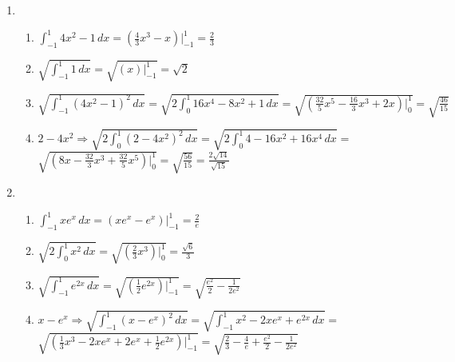 \documentclass[12pt]{article}
\begin{document}
\begin{enumerate}
\begin{enumerate}
    \end{enumerate}

    \setcounter{enumi}{38}

  \item

    \begin{enumerate}

      \item $\int_{-1}^1 4x^2-1\,dx=\left( \frac{4}{3}x^3-x \right)\Big|_{-1}^1=\frac{2}{3}$

      \item $\sqrt{\int_{-1}^1 1\,dx}=\sqrt{(x)\Big|_{-1}^1}=\sqrt{2}$

      \item $\sqrt{\int_{-1}^1 \left( 4x^2-1 \right)^2\,dx}=\sqrt{2\int_0^1 16x^4-8x^2+1\,dx}=\sqrt{\left(\frac{32}{5}x^5-\frac{16}{3}x^3+2x\right)\Big|_0^1}=\sqrt{\frac{46}{15}}$

      \item $2-4x^2\Rightarrow\sqrt{2\int_0^1 \left(2-4x^2\right)^2\,dx}=\sqrt{2\int_0^1 4-16x^2+16x^4\,dx}=$\\$\sqrt{\left(8x-\frac{32}{3}x^3+\frac{32}{5}x^5\right)\Big|_0^1}=\sqrt{\frac{56}{15}}=\frac{2\sqrt{14}}{\sqrt{15}}$

    \end{enumerate}

    \setcounter{enumi}{40}

  \item

    \begin{enumerate}

      \item $\int_{-1}^1 xe^x\,dx=\left( xe^x-e^x \right)\Big|_{-1}^1=\frac{2}{e}$

      \item $\sqrt{2\int_0^1 x^2\,dx}=\sqrt{\left( \frac{2}{3}x^3 \right)\Big|_0^1}=\frac{\sqrt{6}}{3}$

      \item $\sqrt{\int_{-1}^1 e^{2x}\,dx}=\sqrt{\left( \frac{1}{2}e^{2x} \right)\Big|_{-1}^1}=\sqrt{\frac{e^2}{2}-\frac{1}{2e^2}}$

      \item $x-e^x\Rightarrow\sqrt{\int_{-1}^1 \left( x-e^x \right)^2\,dx}=\sqrt{\int_{-1}^1 x^2-2xe^x+e^{2x}\,dx}=$\\$\sqrt{\left( \frac{1}{3}x^3-2xe^x+2e^x+\frac{1}{2}e^{2x} \right)\Big|_{-1}^1}=\sqrt{\frac{2}{3}-\frac{4}{e}+\frac{e^2}{2}-\frac{1}{2e^2}}$

    \end{enumerate}


\end{enumerate}
\end{document}
